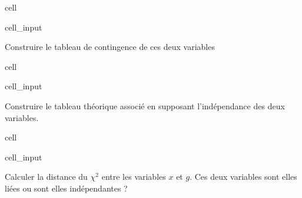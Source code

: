 \documentclass[letterpaper,10pt,french]{sphinxmanual}
\begin{document}
\begin{sphinxuseclass}{cell}
\begin{sphinxuseclass}{cell_input}
\begin{sphinxVerbatim}[commandchars=\\\{\}]
  \PYG{p}{[}\PYG{p}{]}
  \PYG{p}{[}\PYG{p}{]}
\end{sphinxVerbatim}

\end{sphinxuseclass}
\end{sphinxuseclass}
\sphinxAtStartPar
Construire le tableau de contingence de ces deux variables

\begin{sphinxuseclass}{cell}
\begin{sphinxuseclass}{cell_input}
\begin{sphinxVerbatim}[commandchars=\\\{\}]
\end{sphinxVerbatim}

\end{sphinxuseclass}
\end{sphinxuseclass}
\sphinxAtStartPar
Construire le tableau théorique associé en supposant l’indépendance des deux variables.

\begin{sphinxuseclass}{cell}
\begin{sphinxuseclass}{cell_input}
\begin{sphinxVerbatim}[commandchars=\\\{\}]
\end{sphinxVerbatim}

\end{sphinxuseclass}
\end{sphinxuseclass}
\sphinxAtStartPar
Calculer la distance du \(\chi^2\) entre les variables \(x\) et \(g\). Ces deux variables sont elles liées ou sont elles indépendantes ?
\end{document}
